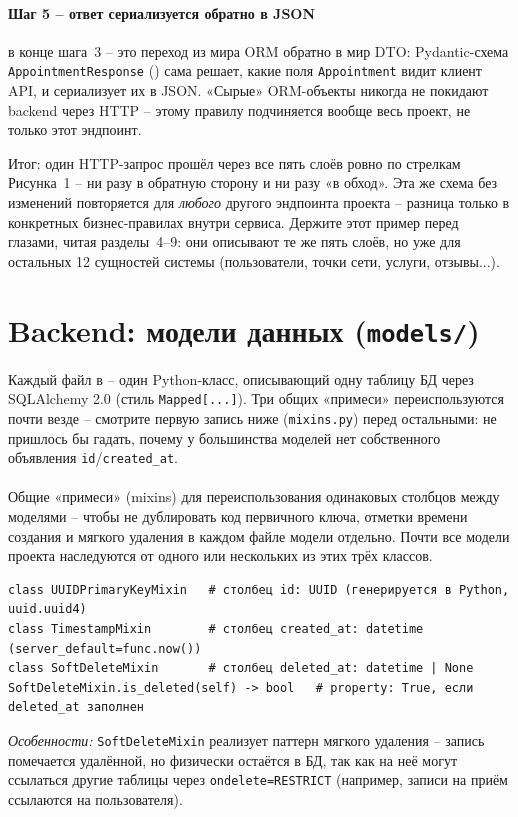 \paragraph{Шаг 5 -- ответ сериализуется обратно в JSON}
 в конце шага~3 -- это
переход из мира ORM обратно в мир DTO: Pydantic-схема
\texttt{AppointmentResponse} ()
сама решает, какие поля \texttt{Appointment} видит клиент API, и
сериализует их в JSON. «Сырые» ORM-объекты никогда не покидают backend
через HTTP -- этому правилу подчиняется вообще весь проект, не только
этот эндпоинт.

Итог: один HTTP-запрос прошёл через все пять слоёв ровно по стрелкам
Рисунка~1 -- ни разу в обратную сторону и ни разу «в обход». Эта же схема
без изменений повторяется для \emph{любого} другого эндпоинта проекта --
разница только в конкретных бизнес-правилах внутри сервиса. Держите этот
пример перед глазами, читая разделы~4--9: они описывают те же пять слоёв,
но уже для остальных 12 сущностей системы (пользователи, точки сети,
услуги, отзывы...).

\section{Backend: модели данных (\texttt{models/})}

Каждый файл в  -- один Python-класс,
описывающий одну таблицу БД через SQLAlchemy 2.0 (стиль
\texttt{Mapped[...]}). Три общих «примеси» переиспользуются почти
везде -- смотрите первую запись ниже (\texttt{mixins.py}) перед
остальными: не пришлось бы гадать, почему у большинства моделей нет
собственного объявления \texttt{id}/\texttt{created_at}.

\paragraph{}
Общие «примеси» (mixins) для переиспользования одинаковых столбцов между
моделями -- чтобы не дублировать код первичного ключа, отметки времени
создания и мягкого удаления в каждом файле модели отдельно. Почти все
модели проекта наследуются от одного или нескольких из этих трёх классов.
\begin{verbatim}
class UUIDPrimaryKeyMixin   # столбец id: UUID (генерируется в Python, uuid.uuid4)
class TimestampMixin        # столбец created_at: datetime (server_default=func.now())
class SoftDeleteMixin       # столбец deleted_at: datetime | None
SoftDeleteMixin.is_deleted(self) -> bool   # property: True, если deleted_at заполнен
\end{verbatim}
\textit{Особенности:} \texttt{SoftDeleteMixin} реализует паттерн мягкого
удаления -- запись помечается удалённой, но физически остаётся в БД, так
как на неё могут ссылаться другие таблицы через \texttt{ondelete=RESTRICT}
(например, записи на приём ссылаются на пользователя).

